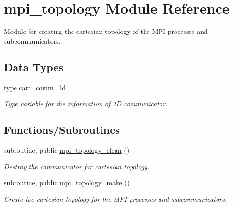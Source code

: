 \hypertarget{namespacempi__topology}{}\section{mpi\+\_\+topology Module Reference}
\label{namespacempi__topology}


Module for creating the cartesian topology of the M\+PI processes and subcommunicators.  


\subsection*{Data Types}
\begin{DoxyCompactItemize}
\item 
type \hyperlink{structmpi__topology_1_1cart__comm__1d}{cart\+\_\+comm\+\_\+1d}
\begin{DoxyCompactList}\small\item\em Type variable for the information of 1D communicator. \end{DoxyCompactList}\end{DoxyCompactItemize}
\subsection*{Functions/\+Subroutines}
\begin{DoxyCompactItemize}
\item 
subroutine, public \hyperlink{namespacempi__topology_aa14e91baaec6d1c1082ebd5ac6e19128}{mpi\+\_\+topology\+\_\+clean} ()
\begin{DoxyCompactList}\small\item\em Destroy the communicator for cartesian topology. \end{DoxyCompactList}\item 
subroutine, public \hyperlink{namespacempi__topology_a8819f16f50aded913f17520a29d3ec4c}{mpi\+\_\+topology\+\_\+make} ()
\begin{DoxyCompactList}\small\item\em Create the cartesian topology for the M\+PI processes and subcommunicators. \end{DoxyCompactList}\end{DoxyCompactItemize}
